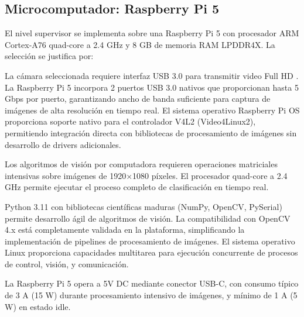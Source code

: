 \subsection{Microcomputador: Raspberry Pi 5}
\label{sec:Raspberry}
El nivel supervisor se implementa sobre una Raspberry Pi 5 con procesador ARM Cortex-A76 quad-core a 2.4 GHz y 8 GB de memoria RAM LPDDR4X. La selección se justifica por:

La cámara seleccionada requiere interfaz USB 3.0 para transmitir video Full HD . La Raspberry Pi 5 incorpora 2 puertos USB 3.0 nativos que proporcionan hasta 5 Gbps por puerto, garantizando ancho de banda suficiente para captura de imágenes de alta resolución en tiempo real. El sistema operativo Raspberry Pi OS proporciona soporte nativo para el controlador V4L2 (Video4Linux2), permitiendo integración directa con bibliotecas de procesamiento de imágenes sin desarrollo de drivers adicionales.

Los algoritmos de visión por computadora requieren operaciones matriciales intensivas sobre imágenes de 1920×1080 píxeles. El procesador quad-core a 2.4 GHz permite ejecutar el proceso completo de clasificación en tiempo real.

 Python 3.11 con bibliotecas científicas maduras (NumPy, OpenCV, PySerial) permite desarrollo ágil de algoritmos de visión. La compatibilidad con OpenCV 4.x está completamente validada en la plataforma, simplificando la implementación de pipelines de procesamiento de imágenes. El sistema operativo Linux proporciona capacidades multitarea para ejecución concurrente de procesos de control, visión, y comunicación.

La Raspberry Pi 5 opera a 5V DC mediante conector USB-C, con consumo típico de 3 A (15 W) durante procesamiento intensivo de imágenes, y mínimo de 1 A (5 W) en estado idle.
